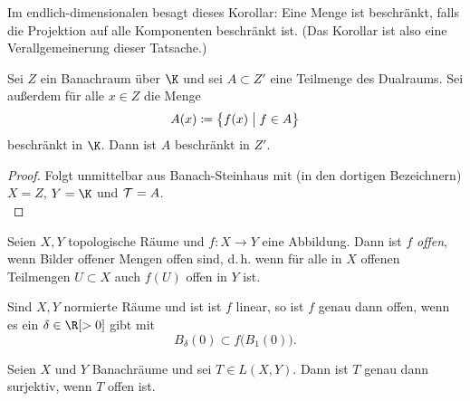 \nnBemerkung Im endlich-dimensionalen besagt dieses Korollar:
Eine Menge ist beschränkt, falls die Projektion auf alle Komponenten beschränkt
ist. (Das Korollar ist also eine Verallgemeinerung dieser Tatsache.)

\begin{thKorollar} \label{vl09:korollar5.7}
    Sei $Z$ ein Banachraum über $\K$ und sei $A\subset Z'$ eine Teilmenge des
    Dualraums. Sei außerdem für alle $x\in Z$ die Menge
    \[ A(x) \coloneqq \bigl\{ f(x) \;\big\vert\; f\in A \bigr\} \]
    beschränkt in $\K$. Dann ist $A$ beschränkt in $Z'$.
\end{thKorollar}

\begin{proof}
    Folgt unmittelbar aus Banach-Steinhaus 
    mit (in den dortigen Bezeichnern) $X=Z$, $Y=\K$ und $\mathcal T = A$.
    \\
\end{proof}

\begin{thDef}
    Seien $X,Y$ topologische Räume und $f\colon X\to Y$ eine Abbildung.
    Dann ist $f$ \emph{offen}, wenn Bilder offener Mengen offen sind, d.\,h.
    wenn für alle in $X$ offenen Teilmengen $U\subset X$ auch $f(U)$ offen in
    $Y$ ist.
\end{thDef}

\nnBemerkung
Sind $X,Y$ normierte Räume und ist ist $f$ linear, so ist $f$ genau dann offen,
wenn es ein $\delta\in\R[>0]$ gibt mit 
\[ B_\delta(0)\subset f\bigl( B_1(0) \bigr)  . \]

\begin{thSatz} \label{vl09:satzvonderoffenenabb}
    Seien $X$ und $Y$ Banachräume und sei $T\in L(X,Y)$. 
    Dann ist $T$ genau dann surjektiv, wenn $T$ offen ist.
\end{thSatz}


